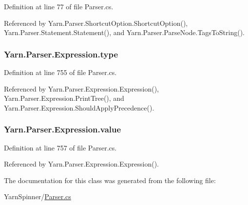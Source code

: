 Definition at line 77 of file Parser.\-cs.



Referenced by Yarn.\-Parser.\-Shortcut\-Option.\-Shortcut\-Option(), Yarn.\-Parser.\-Statement.\-Statement(), and Yarn.\-Parser.\-Parse\-Node.\-Tags\-To\-String().

\hypertarget{a00106_ad55c92df835006328bc2a79a8f91efb9}{
\subsubsection[{type}]{ Yarn.\-Parser.\-Expression.\-type\hspace{0.3cm}{\ttfamily [package]}}}\label{a00106_ad55c92df835006328bc2a79a8f91efb9}


Definition at line 755 of file Parser.\-cs.



Referenced by Yarn.\-Parser.\-Expression.\-Expression(), Yarn.\-Parser.\-Expression.\-Print\-Tree(), and Yarn.\-Parser.\-Expression.\-Should\-Apply\-Precedence().

\hypertarget{a00106_a569e516782891544c334ff8131b23108}{
\subsubsection[{value}]{ Yarn.\-Parser.\-Expression.\-value\hspace{0.3cm}{\ttfamily [package]}}}\label{a00106_a569e516782891544c334ff8131b23108}


Definition at line 757 of file Parser.\-cs.



Referenced by Yarn.\-Parser.\-Expression.\-Expression().



The documentation for this class was generated from the following file\-:\begin{DoxyCompactItemize}
\item 
Yarn\-Spinner/\hyperlink{a00316}{Parser.\-cs}\end{DoxyCompactItemize}
